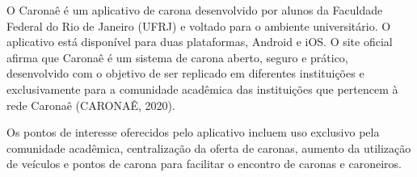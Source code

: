 
O Caronaê é um aplicativo de carona desenvolvido por alunos da Faculdade Federal do Rio de Janeiro (UFRJ) e voltado para o ambiente universitário. O aplicativo está disponível para duas plataformas, Android e iOS. O site oficial afirma que Caronaê é um sistema de carona aberto, seguro e prático, desenvolvido com o objetivo de ser replicado em diferentes instituições e exclusivamente para a comunidade acadêmica das instituições que pertencem à rede Caronaê (CARONAÊ, 2020).

Os pontos de interesse oferecidos pelo aplicativo incluem uso exclusivo pela comunidade acadêmica, centralização da oferta de caronas, aumento da utilização de veículos e pontos de carona para facilitar o encontro de caronas e caroneiros. %

